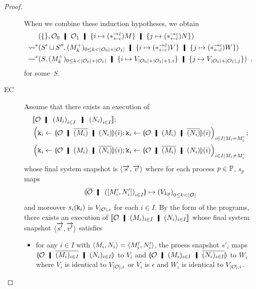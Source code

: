 \begin{proof}
\begin{description}
	  When we combine these induction hypotheses,
	  we obtain
	  \begin{align*}
	   &\concreteconf{\{\}}{
	   \hypert_0\hmid \hypert_1\hmid \{i\mapsto (\comodL) M\}\hmid
	   \{j\mapsto (\comodR)N\}
	   }\\
	   \reduction & \concreteconf{S'\sqcup S''}{ (\m{M}_k)_{0\le k <
	   |\hypert_0|+ |\hypert_1|} \hmid
	   \{i\mapsto(\comodL)V\} \hmid \{j\mapsto (\comodR)W\}}\\
	   \reduction&
	   \concreteconf{S}{(\m{M}_k)_{0\le k <
	   |\hypert_0|+ |\hypert_1|}\hmid
	   \imapsto{V_{|\hypert_0|+|\hypert_1|+1,i}}
	   \hmid\jmapsto{V_{|\hypert_0|+|\hypert_1|,j}}
	   }\enspace.
	  \end{align*}
	  for some~$S$.
     \item[EC]
	  Assume that there exists an execution of
	  \begin{align*}
	   &\semo{\hypert\hmid \left(M_i\right)_{i\in I} \hmid
	   \left(N_i\right)_{i\in I}}; \\
	   &\left(\p k_i\leftarrow
	   \semoi{\hypert\hmid \overline{(M_i)}\hmid
	   (N_i)}(i)
	   ; \p k_i \leftarrow \semoi{\hypert\hmid {(M_i)}\hmid
	   \overline{(N_i)}}(i)\right)_{i\in I\mid M_i =
	   M'_i};
	   \\ &
	   \left(\p k_i\leftarrow
	   \semoi{\hypert\hmid {(M_i)}\hmid
	   \overline{(N_i)}}(i)
	   ; \p k_i \leftarrow
	   \semoi{\hypert\hmid \overline{(M_i)}\hmid
	   (N_i)}(i)
	   \right)_{i\in I\mid M_i \neq
	   M'_i}
	  \end{align*}
	  whose final system snapshot is $\langle{\overrightarrow s, \overrightarrow v}\rangle$
	  where for each process $p\in \mathbb{P}$, $s_p$ maps
	  \[
	   \semoi{\overline{\hypert}\hmid
	  \left(\cotuple{M'_i,N'_i}\right)_{i\in I}}
	  \mapsto
	  \left(V_{kp}\right)_{0\le k < |\hypert|}
	  \]
	  and moreover $s_i(\texttt{k}_i)$ is $V_{|\mathcal{O}|,i}$ for each $i\in
	  I$.
	  By the form of the programs, there exists an execution of
	  $\semo{\hypert\hmid (M_i)_{i\in I}\hmid (N_i)_{i\in I}}$
	  whose final system snapshot $\langle{\overrightarrow{s'}, \overrightarrow{v'}}\rangle$
	  satisfies
	  \begin{itemize}
	   \item for any $i\in I$ with $\langle{M_i,N_i}\rangle = \langle{M'_i,
		 N'_i}\rangle$, the proess snapshot
		 $s'_i$ maps
		 $\semoi{\hypert\hmid \overline{(M_i)_{i\in I}}\hmid
		 (N_i)_{i\in I}}$ to $V_i$ and
		 $\semoi{\hypert\hmid (M_i)_{i\in I}\hmid
		 \overline{(N_i)_{i\in I}}}$ to $W_i$ where
		 $V_i$ is identical to $V_{|\mathcal{O}|,i}$ or
		 $V_i$ is $\epsilon$ and $W_i$ is identical to
		 $V_{|\mathcal{O}|,i}$.

\end{itemize}
\end{description}
\end{proof}
